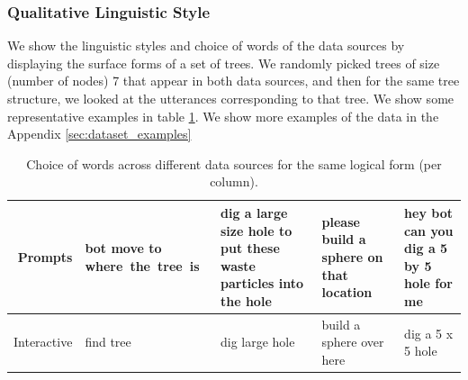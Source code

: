 \subsubsection{Qualitative Linguistic Style} We show the linguistic styles and choice of words of the data sources by displaying the surface forms of a set of trees. We randomly picked trees of size (number of nodes) 7 that appear in both data sources, and then for the same tree structure, we looked at the utterances corresponding to that tree. We show some representative examples in table \ref{tab:ling_1}.  We show more examples of the data in the Appendix \ref{sec:dataset_examples} 


\begin{table}
\center
\small
\begin{tabular}{r  m{2.0cm} m{4.2cm} m{3.0cm} m{3.0cm}}
\toprule
Prompts     & bot move to \mbox{where the tree is}& dig a large size hole to put these waste particles into the hole   & please build a sphere on that location       	& hey bot can you dig a 5 by 5 hole for me   \\  \midrule%
Interactive & find tree       	& dig large hole    & build a sphere over here    & dig a 5 x 5 hole  \\ \bottomrule %
\end{tabular}
\caption{Choice of words across different data sources for the same logical form (per column).}
\label{tab:ling_1}
\end{table}


